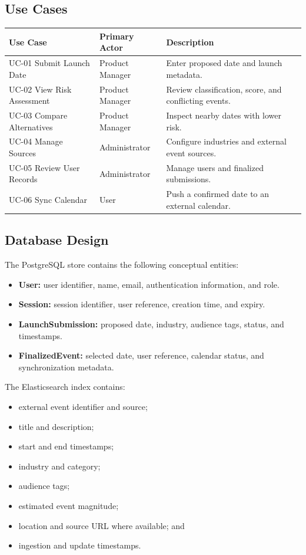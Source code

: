 \documentclass[12pt]{article}
\begin{document}
\subsection{Use Cases}
\begin{longtable}{p{}p{}p{}}
\toprule
\textbf{Use Case} & \textbf{Primary Actor} & \textbf{Description}\\
\midrule
UC-01 Submit Launch Date & Product Manager & Enter proposed date and launch metadata.\\
UC-02 View Risk Assessment & Product Manager & Review classification, score, and conflicting events.\\
UC-03 Compare Alternatives & Product Manager & Inspect nearby dates with lower risk.\\
UC-04 Manage Sources & Administrator & Configure industries and external event sources.\\
UC-05 Review User Records & Administrator & Manage users and finalized submissions.\\
UC-06 Sync Calendar & User & Push a confirmed date to an external calendar.\\
\bottomrule
\end{longtable}

\subsection{Database Design}
The PostgreSQL store contains the following conceptual entities:
\begin{itemize}[leftmargin=0.7cm]
\item \textbf{User:} user identifier, name, email, authentication information, and role.
\item \textbf{Session:} session identifier, user reference, creation time, and expiry.
\item \textbf{LaunchSubmission:} proposed date, industry, audience tags, status, and timestamps.
\item \textbf{FinalizedEvent:} selected date, user reference, calendar status, and synchronization metadata.
\end{itemize}

The Elasticsearch index contains:
\begin{itemize}[leftmargin=0.7cm]
\item external event identifier and source;
\item title and description;
\item start and end timestamps;
\item industry and category;
\item audience tags;
\item estimated event magnitude;
\item location and source URL where available; and
\item ingestion and update timestamps.
\end{itemize}
\end{document}
